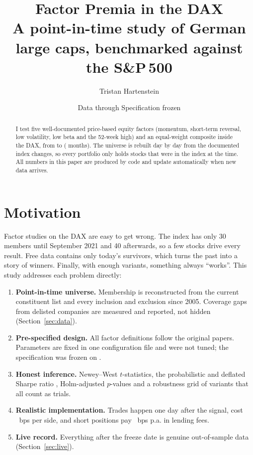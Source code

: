 \documentclass[10pt,a4paper]{article}
\title{\textbf{Factor Premia in the DAX}\\[2pt]\large A point-in-time study of German large caps, benchmarked against the S\&P\,500}
\author{Tristan Hartenstein}
\date{Data through \DataDate{} \textperiodcentered{} Specification frozen \FreezeDate}
\begin{document}
\maketitle

\begin{abstract}\noindent
I test five well-documented price-based equity factors (momentum, short-term reversal, low volatility,
low beta and the 52-week high) and an equal-weight composite inside the DAX, from \FirstMonth{} to
\LastMonth{} (\NMonths{} months). The universe is rebuilt day by day from the \NChanges{} documented index
changes, so every portfolio only holds stocks that were in the index at the time.
\FindBest{} \FindHolm{} \FindDSR{} \FindComposite{} \FindSurvivorship{}
All numbers in this paper are produced by code and update automatically when new data arrives.
\end{abstract}

\section{Motivation}
Factor studies on the DAX are easy to get wrong. The index has only 30 members until September 2021 and 40
afterwards, so a few stocks drive every result. Free data contains only today's survivors, which turns
the past into a story of winners. Finally, with enough variants, something always ``works''. This study
addresses each problem directly:
\begin{enumerate}
  \item \textbf{Point-in-time universe.} Membership is reconstructed from the current constituent list and
  every inclusion and exclusion since 2005. Coverage gaps from delisted companies are measured and
  reported, not hidden (Section~\ref{sec:data}).
  \item \textbf{Pre-specified design.} All factor definitions follow the original papers. Parameters are
  fixed in one configuration file and were not tuned; the specification was frozen on \FreezeDate.
  \item \textbf{Honest inference.} Newey--West $t$-statistics, the probabilistic and deflated Sharpe
  ratio \citep{bailey2014}, Holm-adjusted $p$-values and a robustness grid of \NTrials{} variants that all
  count as trials.
  \item \textbf{Realistic implementation.} Trades happen one day after the signal, cost
  \CostBps{}~bps per side, and short positions pay \BorrowBps{}~bps p.a. in lending fees.
  \item \textbf{Live record.} Everything after the freeze date is genuine out-of-sample data
  (Section~\ref{sec:live}).
\end{enumerate}
\end{document}
